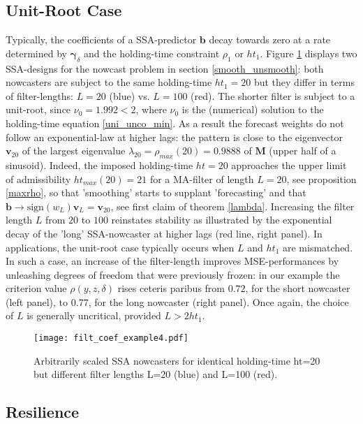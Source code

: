 \documentclass[a4paper]{article}
\begin{document}
\subsection{Unit-Root Case}\label{unit_root_case}


Typically, the coefficients of a SSA-predictor $\mathbf{b}$ decay towards zero at a rate determined by $\boldsymbol{\gamma}_{\delta}$ and the holding-time constraint $\rho_1$ or $ht_1$. Figure \ref{filt_coef_example4} displays two SSA-designs for the nowcast problem in section \ref{smooth_unsmooth}: both nowcasters are subject to the same holding-time $ht_1=20$ but they differ in terms of filter-lengths: $L=20$ (blue) vs. $L=100$ (red). The shorter filter is subject to a unit-root, since $\nu_0=1.992<2$, where $\nu_0$ is the (numerical) solution to the holding-time equation \ref{uni_unco_min}. As a result the forecast weights do not follow an exponential-law at higher lags: the pattern is close to the eigenvector $\mathbf{v}_{20}$ of the largest eigenvalue $\lambda_{20}=\rho_{max}(20)=0.9888$ of $\mathbf{M}$ (upper half of a sinusoid). Indeed, the imposed holding-time $ht=20$ approaches the upper limit of admissibility $ht_{max}(20)=21$ for a MA-filter of length $L=20$, see proposition \ref{maxrho}, so that 'smoothing' starts to supplant 'forecasting' and that $\mathbf{b}\to\textrm{sign}(w_L)\mathbf{v}_{L}=\mathbf{v}_{20}$, see first claim of theorem \ref{lambda}. Increasing the filter length $L$ from $20$ to $100$ reinstates stability as illustrated by the exponential decay of the 'long' SSA-nowcaster at higher lags (red line, right panel). In applications, the unit-root case typically occurs when $L$ and $ht_1$ are mismatched. In such a case, an increase of the filter-length improves MSE-performances by unleashing degrees of freedom that were previously frozen: in our example the criterion value $\rho(y,z,\delta)$ rises ceteris paribus from $0.72$, for the short nowcaster (left panel), to $0.77$, for the long nowcaster (right panel).  Once again, the choice of $L$ is generally uncritical, provided $L>2ht_1$.   
\begin{figure}[H]\begin{center}\texttt{[image: filt\_coef\_example4.pdf]}\caption{Arbitrarily scaled SSA nowcasters for identical holding-time ht=20 but different filter lengths L=20 (blue) and L=100 (red).\label{filt_coef_example4}}\end{center}\end{figure}


\subsection{Resilience}\label{resil}
\end{document}
